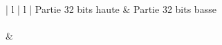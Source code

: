 \begin{center}
\begin{tabular}{ | l | l | }
\hline
	Partie 32 bits haute & Partie 32 bits basse \\
\hline
{} \\
\hline
{} &  \\
\hline
\end{tabular}
\end{center}
